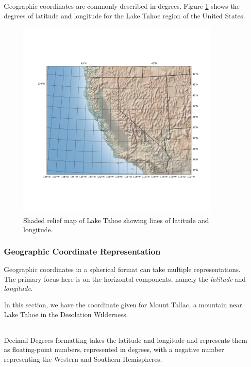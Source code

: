 Geographic coordinates are commonly described in degrees.  Figure 
\ref{fig:figure_1_1} shows the degrees of latitude and longitude
for the Lake Tahoe region of the United States.

\begin{figure}[h!]
\includegraphics[width=4in]{chapter1/diagrams/figure_1_1.png}
\caption{Shaded relief map of Lake Tahoe showing lines of latitude and longitude.}
\label{fig:figure_1_1}
\end{figure}


\subsubsection*{Geographic Coordinate Representation}

Geographic coordinates in a spherical format can take multiple representations.  The primary focus
here is on the horizontal components, namely the \emph{latitude} and \emph{longitude}.

In this section, we have the coordinate given for Mount Tallac, a mountain near Lake Tahoe in the
Desolation Wilderness.  

\vspace{5mm}
\\

Decimal Degrees formatting takes the latitude and longitude and represents them as floating-point numbers,
represented in degrees, with a negative number representing the Western and Southern Hemispheres.

